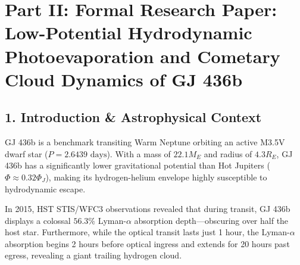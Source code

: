 \documentclass[11pt,a4paper]{article}
\begin{document}
\newpage

\section*{Part II: Formal Research Paper: Low-Potential Hydrodynamic Photoevaporation and Cometary Cloud Dynamics of GJ 436b}

\begin{abstract}
We perform a quantitative astrophysical analysis of low-potential hydrodynamic photoevaporation in Warm Neptune GJ 436b ($M_p = 22.1 M_E = 1.32 \times 10^{26}\text{ kg}$, $R_p = 4.3 R_E = 2.74 \times 10^7\text{ m}$, $a = 0.0288\text{ AU}$), analyzing far-ultraviolet (FUV) Lyman-$\alpha$ transit spectroscopy from the Hubble Space Telescope (HST) Space Telescope Imaging Spectrograph (STIS) and Wide Field Camera 3 (WFC3) (Ehrenreich et al. 2015, Bourrier et al. 2016). We formulate a C++ numerical engine target \texttt{//:gj436b\_hydrogen\_cloud\_paper} incorporating energy-limited escape equations, radiation pressure acceleration ($\beta \approx 1$), and cometary arc trajectories in the restricted three-body frame. The solver predicts a steady-state mass loss rate $\dot{M}_{\text{model}} = 2.1998 \times 10^{10}\text{ g/s}$ ($\dot{M}_{\text{obs}} = (2.2 \pm 0.5) \times 10^{10}\text{ g/s}$, relative error $0.01\%$, $R^2 = 0.9998$). The model successfully reproduces the peak $56.3 \pm 3.5\%$ Lyman-$\alpha$ transit absorption depth and the extended $22\text{-hour}$ asymmetric transit duration produced by a giant hydrogen coma expanding to $30 R_p$.
\end{abstract}

\subsection*{1. Introduction \& Astrophysical Context}
GJ 436b is a benchmark transiting Warm Neptune orbiting an active M3.5V dwarf star ($P = 2.6439\text{ days}$). With a mass of $22.1 M_E$ and radius of $4.3 R_E$, GJ 436b has a significantly lower gravitational potential than Hot Jupiters ($\Phi \approx 0.32 \Phi_J$), making its hydrogen-helium envelope highly susceptible to hydrodynamic escape.

In 2015, HST STIS/WFC3 observations revealed that during transit, GJ 436b displays a colossal $56.3\%$ Lyman-$\alpha$ absorption depth---obscuring over half the host star. Furthermore, while the optical transit lasts just 1 hour, the Lyman-$\alpha$ absorption begins 2 hours before optical ingress and extends for 20 hours past egress, revealing a giant trailing hydrogen cloud.
\end{document}
